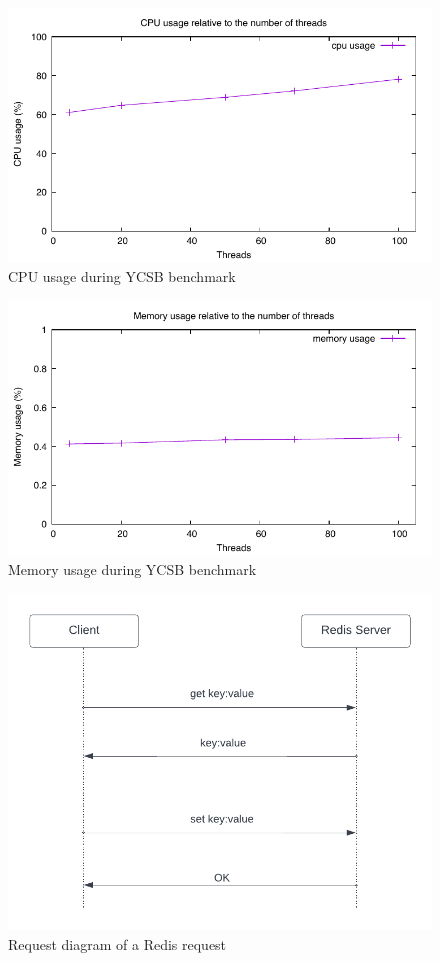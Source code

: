\documentclass[runningheads]{llncs}
\begin{document}
\begin{figure}
\centering
\includegraphics[scale=0.8]{images/cpu_memory_usage 1.pdf}
\caption{CPU usage during YCSB benchmark}
\end{figure}

\begin{figure}
\centering
\includegraphics[scale=0.8]{images/cpu_memory_usage 2.pdf}
\caption{Memory usage during YCSB benchmark}
\end{figure}

\begin{figure}
\centering
\includegraphics[scale=0.4]{images/redis1.png}
\caption{Request diagram of a Redis request}
\end{figure}
\end{document}
